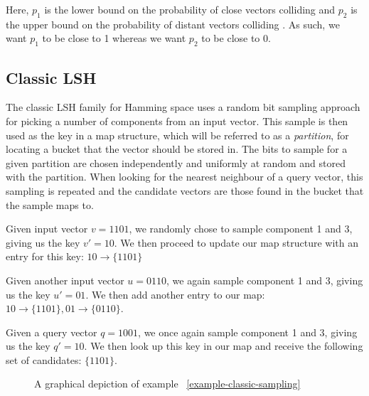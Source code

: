 Here, $p_1$ is the lower bound on the probability of close vectors colliding and $p_2$ is the upper bound on the probability of distant vectors colliding \cite[p. 100]{DBLP:books/cu/LeskovecRU14}. As such, we want $p_1$ to be close to 1 whereas we want $p_2$ to be close to 0.

\subsection{Classic LSH}
\label{background-classic-lsh}

The classic LSH family for Hamming space uses a random bit sampling approach for picking a number of components from an input vector. This sample is then used as the key in a map structure, which will be referred to as a \textit{partition}, for locating a bucket that the vector should be stored in. The bits to sample for a given partition are chosen independently and uniformly at random and stored with the partition. When looking for the nearest neighbour of a query vector, this sampling is repeated and the candidate vectors are those found in the bucket that the sample maps to.

\begin{example}
\label{example-classic-sampling}
  Given input vector $v = 1101$, we randomly chose to sample component 1 and 3, giving us the key $v' = 10$. We then proceed to update our map structure with an entry for this key: $10 \rightarrow \{1101\}$

  Given another input vector $u = 0110$, we again sample component 1 and 3, giving us the key $u' = 01$. We then add another entry to our map: $10 \rightarrow \{1101\}, 01 \rightarrow \{0110\}$.

  Given a query vector $q = 1001$, we once again sample component 1 and 3, giving us the key $q' = 10$. We then look up this key in our map and receive the following set of candidates: $\{1101\}$.
\end{example}

\begin{figure}[ht]
  \centering

  \caption{A graphical depiction of example ~\ref{example-classic-sampling}}
  \label{figure-classic-sampling}
\end{figure}

